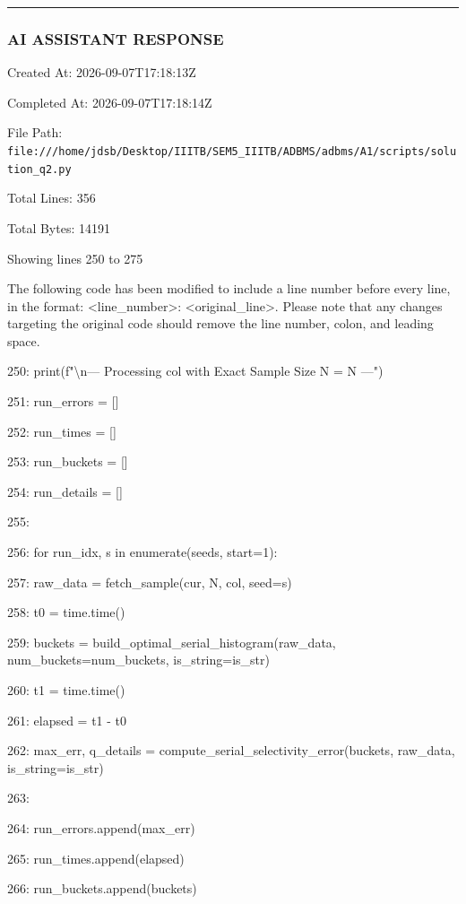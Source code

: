 \documentclass[11pt,a4paper]{article}
\begin{document}
\hrule

\subsubsection{AI ASSISTANT RESPONSE}

Created At: 2026-09-07T17:18:13Z

Completed At: 2026-09-07T17:18:14Z

File Path: \texttt{file:///home/jdsb/Desktop/IIITB/SEM5\_IIITB/ADBMS/adbms/A1/scripts/solution\_q2.py}

Total Lines: 356

Total Bytes: 14191

Showing lines 250 to 275

The following code has been modified to include a line number before every line, in the format: <line\_number>: <original\_line>. Please note that any changes targeting the original code should remove the line number, colon, and leading space.

250:             print(f"\textbackslash{}n--- Processing {col} with Exact Sample Size N = {N} ---")

251:             run\_errors = []

252:             run\_times = []

253:             run\_buckets = []

254:             run\_details = []

255:

256:             for run\_idx, s in enumerate(seeds, start=1):

257:                 raw\_data = fetch\_sample(cur, N, col, seed=s)

258:                 t0 = time.time()

259:                 buckets = build\_optimal\_serial\_histogram(raw\_data, num\_buckets=num\_buckets, is\_string=is\_str)

260:                 t1 = time.time()

261:                 elapsed = t1 - t0

262:                 max\_err, q\_details = compute\_serial\_selectivity\_error(buckets, raw\_data, is\_string=is\_str)

263:

264:                 run\_errors.append(max\_err)

265:                 run\_times.append(elapsed)

266:                 run\_buckets.append(buckets)
\end{document}
